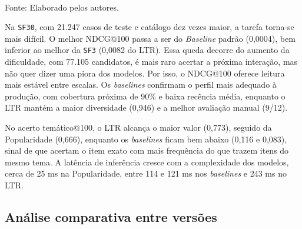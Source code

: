 \documentclass[a4paper,12pt]{article}
\begin{document}
{\begin{table}[H]
\centering
\caption{Resultados da rodada final na versão \texttt{SF30}}
\label{tab:resultados_sf30}
\scriptsize
{}
\small \\ Fonte: Elaborado pelos autores.
\end{table}

Na \texttt{SF30}, com 21.247 casos de teste e catálogo dez vezes maior, a tarefa torna-se mais difícil. O melhor NDCG@100 passa a ser do \textit{Baseline} padrão (0,0004), bem inferior ao melhor da \texttt{SF3} (0,0082 do LTR). Essa queda decorre do aumento da dificuldade, com 77.105 candidatos, é mais raro acertar a próxima interação, mas não quer dizer uma piora dos modelos. Por isso, o NDCG@100 oferece leitura mais estável entre escalas. Os \textit{baselines} confirmam o perfil mais adequado à produção, com cobertura próxima de 90\% e baixa recência média, enquanto o LTR mantém a maior diversidade (0,946) e a melhor avaliação manual (9/12). 

No acerto temático@100, o LTR alcança o maior valor (0,773), seguido da Popularidade (0,666), enquanto os \textit{baselines} ficam bem abaixo (0,116 e 0,083), sinal de que acertam o item exato com mais frequência do que trazem itens do mesmo tema. A latência de inferência cresce com a complexidade dos modelos, cerca de 25 ms na Popularidade, entre 114 e 121 ms nos \textit{baselines} e 243 ms no LTR.


\subsection{Análise comparativa entre versões}

}
\end{document}
